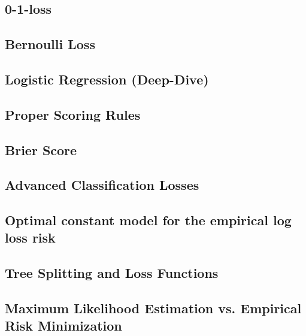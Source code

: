 \subsection{0-1-loss}


\subsection{Bernoulli Loss}


\subsection{Logistic Regression (Deep-Dive)}


\subsection{Proper Scoring Rules}


\subsection{Brier Score}


\subsection{Advanced Classification Losses}


\subsection{Optimal constant model for the empirical log loss risk}


\subsection{Tree Splitting and Loss Functions}


\subsection{Maximum Likelihood Estimation vs. Empirical Risk Minimization}


